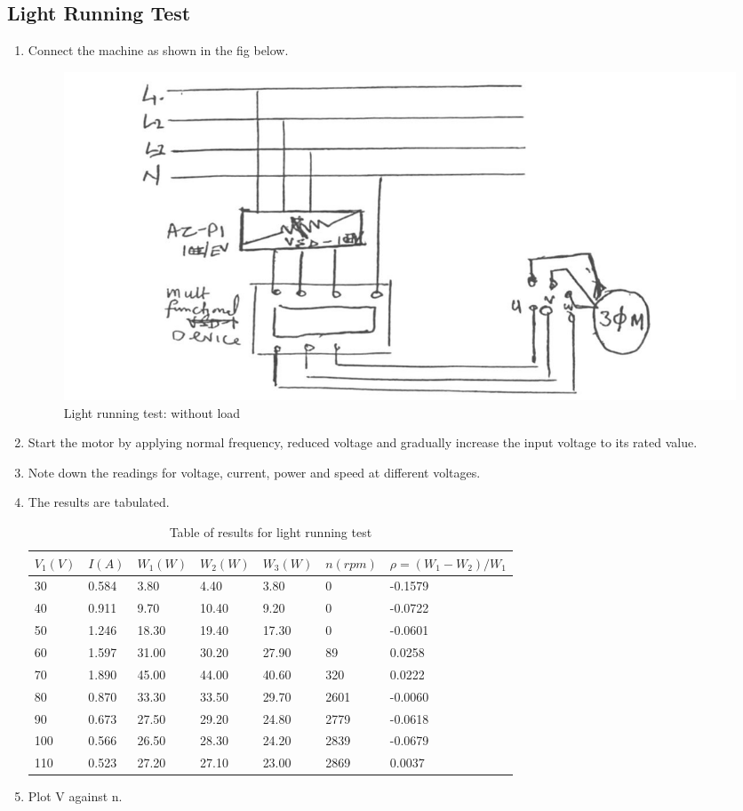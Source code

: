 \documentclass[12pt,a4paper]{report}
\begin{document}
\subsection{Light Running Test}
\begin{enumerate}
    \item Connect the machine as shown in the fig below.
    \begin{figure}[H]
        \centering
        \includegraphics[width=0.8\linewidth]{figure_5_5.jpeg}
        \caption{Light running test: without load}
        \label{fig_5}
    \end{figure}
    \item Start the motor by applying normal frequency, reduced voltage and gradually increase the input voltage to its rated value.
    \item Note down the readings for voltage, current, power and speed at different voltages.
    \item The results are tabulated.


\begin{table}[H]
\centering
    \caption{Table of results for light running test}
    \begin{tabular}{|l|l|l|l|l|l|l|}
    \hline
    $V_{1}(V)$ & $I(A)$  & $W_{1}(W)$ & $W_{2}(W)$ & $W_{3}(W)$ & $n(rpm)$ & $\rho=(W_{1}-W_{2})/W_{1}$ \\ \hline
    30    & 0.584 & 3.80  & 4.40  & 3.80  & 0      & -0.1579      \\ \hline
    40    & 0.911 & 9.70  & 10.40 & 9.20  & 0      & -0.0722      \\ \hline
    50    & 1.246 & 18.30 & 19.40 & 17.30 & 0      & -0.0601      \\ \hline
    60    & 1.597 & 31.00 & 30.20 & 27.90 & 89     & 0.0258       \\ \hline
    70    & 1.890 & 45.00 & 44.00 & 40.60 & 320    & 0.0222       \\ \hline
    80    & 0.870 & 33.30 & 33.50 & 29.70 & 2601   & -0.0060      \\ \hline
    90    & 0.673 & 27.50 & 29.20 & 24.80 & 2779   & -0.0618      \\ \hline
    100   & 0.566 & 26.50 & 28.30 & 24.20 & 2839   & -0.0679      \\ \hline
    110   & 0.523 & 27.20 & 27.10 & 23.00 & 2869   & 0.0037       \\ \hline
    \end{tabular}
    \end{table}
    \item Plot V against n.
\end{enumerate}
\end{document}
